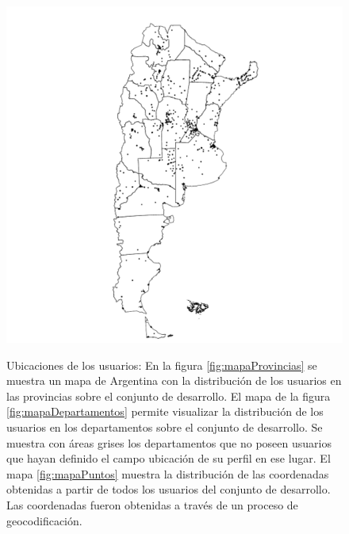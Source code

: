 \begin{figure}[!ht]
\begin{minipage}{0.31\textwidth}
    \label{fig:mapaDepartamentos} 
   \end{minipage}
   \begin{minipage}{0.31\textwidth}
    \includegraphics[width=\linewidth]{./images/mapaprovinciasConPuntos.pdf}
    \label{fig:mapaPuntos} 
   \end{minipage}
   


   \caption{Ubicaciones de los usuarios: En la figura \ref{fig:mapaProvincias} se muestra un mapa de Argentina con la distribución de los usuarios en las provincias sobre el conjunto de desarrollo. El mapa de la figura \ref{fig:mapaDepartamentos} permite visualizar la distribución de los usuarios en los departamentos sobre el conjunto de desarrollo. Se muestra con áreas grises los departamentos que no poseen usuarios que hayan definido el campo ubicación de su perfil en ese lugar. El mapa \ref{fig:mapaPuntos} muestra la distribución de las coordenadas obtenidas a partir de todos los usuarios del conjunto de desarrollo. Las coordenadas fueron obtenidas a través de un proceso de geocodificación. } 
  \label{fig:busqueda_usuarios} 

\end{figure}

